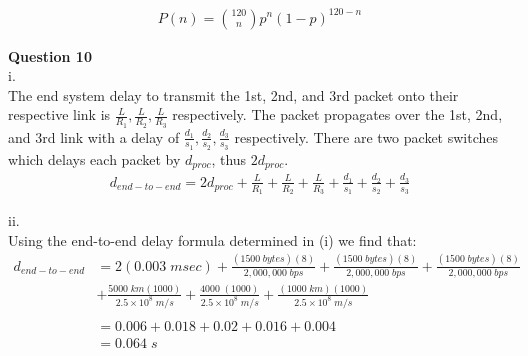 \documentclass{article}
\begin{document}
\begin{equation*}
    \begin{split}
        P(n) = {120 \choose n} p^{n} (1-p)^{120-n} 
    \end{split}
\end{equation*}

{\bf Question 10}\\
i.\\
The end system delay to transmit the 1st, 2nd, and 3rd packet onto their respective link is $\frac{L}{R_1}, \frac{L}{R_2}, \frac{L}{R_3}$ respectively. The packet propagates over the 1st, 2nd, and 3rd link with a delay of $\frac{d_1}{s_1}, \frac{d_2}{s_2}, \frac{d_3}{s_3}$ respectively. There are two packet switches which delays each packet by $d_{proc}$, thus $2d_{proc}$.
\begin{equation*}
    \begin{split}
       d_{end-to-end} = 2d_{proc}+\frac{L}{R_1}+\frac{L}{R_2}+\frac{L}{R_3}+\frac{d_1}{s_1}+\frac{d_2}{s_2}+\frac{d_3}{s_3}
    \end{split}
\end{equation*}

ii.\\
Using the end-to-end delay formula determined in (i) we find that:
\begin{equation*}
    \begin{split}
       d_{end-to-end} &= 2(0.003\;msec)+\frac{(1500\;bytes)(8)}{2,000,000\;bps}+\frac{(1500\;bytes)(8)}{2,000,000\;bps}+\frac{(1500\;bytes)(8)}{2,000,000\;bps}
       \\&+\frac{5000\;km(1000)}{2.5\times10^8\;m/s}+\frac{4000\;(1000)}{2.5\times10^8\;m/s}+\frac{(1000\;km)(1000)}{2.5\times10^8\;m/s}\\
       \\&= 0.006 + 0.018 + 0.02 + 0.016 + 0.004\\
       &= 0.064\;s
    \end{split}
\end{equation*}
\end{document}
